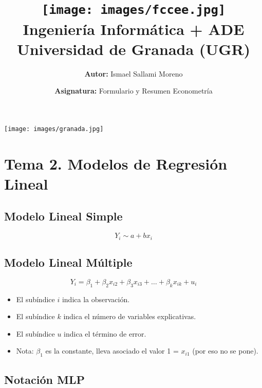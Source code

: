 \documentclass[a4paper,12pt]{article}
\title{
    \vspace{-2cm}
    \texttt{[image: images/fccee.jpg]} \\ %
    \LARGE Ingeniería Informática + ADE\\
    \large Universidad de Granada (UGR)\\[1cm]
}
\author{\textbf{Autor:} Ismael Sallami Moreno}
\date{\textbf{Asignatura:} Formulario y Resumen Econometría}
\begin{document}
\maketitle
\thispagestyle{empty}

\begin{center}
    \texttt{[image: images/granada.jpg]} \\ %
    \vfill
\end{center}

\newpage

\tableofcontents
\newpage

\section{Tema 2. Modelos de Regresión Lineal}

\subsection{Modelo Lineal Simple}

\begin{equation}
    Y_i \sim a + bx_i
\end{equation}

\subsection{Modelo Lineal Múltiple}

\begin{equation}
    Y_i = \beta_1 + \beta_2 x_{i2} + \beta_3 x_{i3} + \ldots + \beta_k x_{ik} + u_i
\end{equation}

\begin{itemize}
    \item El subíndice $i$ indica la observación.
    \item El subíndice $k$ indica el número de variables explicativas.
    \item El subíndice $u$ indica el término de error.
    \item Nota: $\beta_1$ es la constante, lleva asociado el valor 1 = $x_{i1}$ (por eso no se pone).
\end{itemize}

\subsection{Notación MLP}
\end{document}
